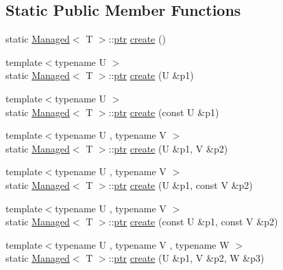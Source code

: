 \subsection*{Static Public Member Functions}
\begin{DoxyCompactItemize}
\item 
static \hyperlink{class_managed}{Managed}$<$ T $>$\-::\hyperlink{class_managed_a59aa857eaf753735f65130812e98e9a9}{ptr} \hyperlink{class_managed_afadb1cf0a8cdee54b09d4c258152d616}{create} ()
\item 
{\footnotesize template$<$typename U $>$ }\\static \hyperlink{class_managed}{Managed}$<$ T $>$\-::\hyperlink{class_managed_a59aa857eaf753735f65130812e98e9a9}{ptr} \hyperlink{class_managed_ac761a76d1d49640ee209d0ad0b354f00}{create} (U \&p1)
\item 
{\footnotesize template$<$typename U $>$ }\\static \hyperlink{class_managed}{Managed}$<$ T $>$\-::\hyperlink{class_managed_a59aa857eaf753735f65130812e98e9a9}{ptr} \hyperlink{class_managed_a282c1a83715ed401089ed48be5963502}{create} (const U \&p1)
\item 
{\footnotesize template$<$typename U , typename V $>$ }\\static \hyperlink{class_managed}{Managed}$<$ T $>$\-::\hyperlink{class_managed_a59aa857eaf753735f65130812e98e9a9}{ptr} \hyperlink{class_managed_ad323d01ada8b339acc1799d0d6770189}{create} (U \&p1, V \&p2)
\item 
{\footnotesize template$<$typename U , typename V $>$ }\\static \hyperlink{class_managed}{Managed}$<$ T $>$\-::\hyperlink{class_managed_a59aa857eaf753735f65130812e98e9a9}{ptr} \hyperlink{class_managed_aae1f65bc07d0f756da9802453b169bce}{create} (U \&p1, const V \&p2)
\item 
{\footnotesize template$<$typename U , typename V $>$ }\\static \hyperlink{class_managed}{Managed}$<$ T $>$\-::\hyperlink{class_managed_a59aa857eaf753735f65130812e98e9a9}{ptr} \hyperlink{class_managed_ad97ec80ee809c446703a312200ae2066}{create} (const U \&p1, const V \&p2)
\item 
{\footnotesize template$<$typename U , typename V , typename W $>$ }\\static \hyperlink{class_managed}{Managed}$<$ T $>$\-::\hyperlink{class_managed_a59aa857eaf753735f65130812e98e9a9}{ptr} \hyperlink{class_managed_a9c7f6c0ff975263fca730d3f83ee7543}{create} (U \&p1, V \&p2, W \&p3)

\end{DoxyCompactItemize}
